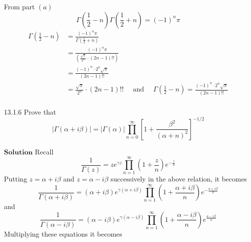 From part $(a)$ 
$$
\Gamma\left(\frac{1}{2}-n\right) \Gamma\left(\frac{1}{2}+n\right)=(-1)^{n} \pi
$$
$$
\begin{aligned}
\Gamma\left(\frac{1}{2}-n\right)&=\frac{(-1)^{n} \pi}{\Gamma\left(\frac{1}{2}+n\right)} \\
&=\frac{(-1)^{n} \pi}{\left(\frac{\sqrt{\pi}}{2^{n}} \cdot(2 n-1) ! !\right)} \\
&=\frac{(-1)^{n} \cdot 2^{n} \sqrt{\pi}}{(2 n-1) ! !} \\
&=\frac{\sqrt{\pi}}{2^{n}} \cdot(2 n-1) ! ! \quad \text { and } \quad \Gamma\left(\frac{1}{2}-n\right)=\frac{(-1)^{n} \cdot 2^{n} \sqrt{\pi}}{(2 n-1) ! !} \\
\end{aligned}
$$

\newpage

\begin{mybox}{13.1.6}
Prove that 
$$|\Gamma(\alpha+i \beta)|=|\Gamma(\alpha)| \prod_{n=0}^{\infty}\left[1+\frac{\beta^{2}}{(\alpha+n)^{2}}\right]^{-1 / 2}$$
\end{mybox}

$\boxed{\textbf{Solution}}$ Recall 
$$
\frac{1}{\Gamma(z)}=z e^{\gamma z} \prod_{n=1}^{\infty}\left(1+\frac{z}{n}\right) e^{-\frac{z}{n}}
$$
Putting $z=\alpha+i \beta$ and $z=\alpha-i \beta$ successively in the above relation, it becomes
$$
\frac{1}{\Gamma(\alpha+i \beta)}=(\alpha+i \beta) e^{\gamma(\alpha+i \beta)} \prod_{n=1}^{\infty}\left(1+\frac{\alpha+i \beta}{n}\right) e^{-\frac{a+i \beta}{n}}
$$
and 
$$
\frac{1}{\Gamma(\alpha-i \beta)}=(\alpha-i \beta) e^{\gamma(\alpha-i \beta)} \prod_{n=1}^{\infty}\left(1+\frac{\alpha-i \beta}{n}\right) e^{\frac{a-i \beta}{n}}
$$
Multiplying these equations it becomes

